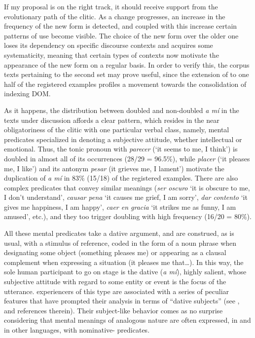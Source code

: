 \documentclass[output=paper]{LSP/langsci}
\begin{document}
 If my proposal is on the right track, it should receive support from the evolutionary path of the clitic. As a change progresses, an increase in the frequency of the new form is detected, and coupled with this increase certain patterns of use become visible. The choice of the new form over the older one loses its dependency on specific discourse contexts and acquires some systematicity, meaning that certain types of contexts now motivate the appearance of the new form on a regular basis. In order to verify this, the corpus texts pertaining to the second set may prove useful, since the extension of  to one half of the registered examples profiles a movement towards the consolidation of indexing DOM.

 As it happens, the distribution between doubled and non-doubled \textit{a mí} in the texts under discussion affords a clear pattern, which resides in the near obligatoriness of the clitic with one particular verbal class, namely, mental predicates specialized in denoting a subjective attitude, whether intellectual or emotional. Thus, the tonic pronoun with \textit{parecer} (‘it seems to me, I think’) is doubled in almost all of its occurrences (28/29 = 96.5\%), while \textit{placer} (‘it pleases me, I like’) and its antonym \textit{pesar} (it grieves me, I lament’) motivate the duplication of \textit{a mí} in 83\% (15/18) of the registered examples. There are also complex predicates that convey similar meanings (\textit{ser oscuro} ‘it is obscure to me, I don’t understand’, \textit{causar pena} ‘it causes me grief, I am sorry’, \textit{dar contento} ‘it gives me happiness, I am happy’, \textit{caer en gracia} ‘it strikes me as funny, I am amused’, etc.), and they too trigger doubling with high frequency (16/20 = 80\%).

 All these mental predicates take a dative  argument, and are construed, as is usual, with a stimulus of  reference, coded in the form of a noun phrase when designating some object (\cf something pleases me) or appearing as a clausal complement when expressing a situation (\cf it pleases me that…). In this way, the sole human participant to go on stage is the dative  (\textit{a mí}), highly salient, whose subjective attitude with regard to some entity or event is the focus of the utterance.  experiencers of this type are associated with a series of peculiar features that have prompted their analysis in terms of “dative subjects” (see \citealt{Melisetal2013Historical}, and references therein). Their subject-like behavior comes as no surprise considering that mental meanings of analogous nature are often expressed, in  and in other languages, with nominative- predicates.
\end{document}
